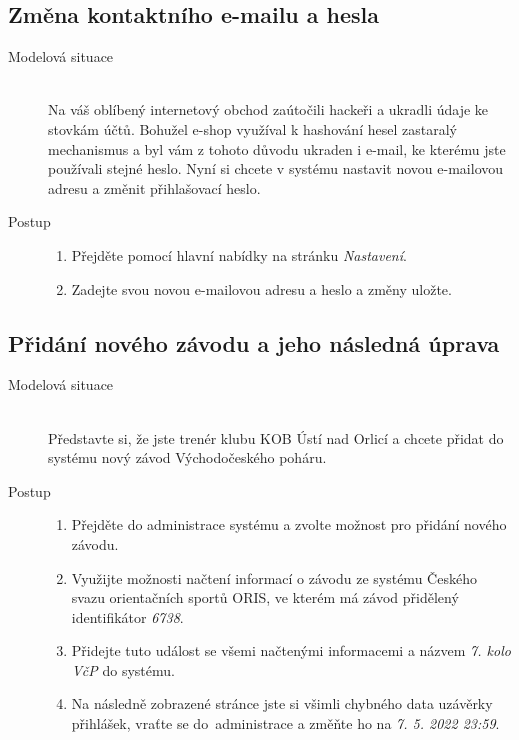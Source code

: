 \subsection{Změna kontaktního e-mailu a hesla}
\begin{description}
    \item[Modelová situace] \hfill \\
        Na váš oblíbený internetový obchod zaútočili hackeři a ukradli údaje ke stovkám účtů. Bohužel e-shop využíval k hashování hesel zastaralý mechanismus a byl vám z tohoto důvodu ukraden i e-mail, ke kterému jste používali stejné heslo. Nyní si chcete v systému nastavit novou e-mailovou adresu a změnit přihlašovací heslo.
        \item[Postup] \hfill
        \vspace{-2mm}
        \begin{enumerate}
            \item Přejděte pomocí hlavní nabídky na stránku \emph{Nastavení}.
            \item Zadejte svou novou e-mailovou adresu a heslo a změny uložte.
        \end{enumerate}
\end{description}

\newpage
\subsection{Přidání nového závodu a jeho následná úprava}
\begin{description}
    \item[Modelová situace] \hfill \\
        Představte si, že jste trenér klubu KOB Ústí nad Orlicí a chcete přidat do systému nový závod Východočeského poháru.
    \item[Postup] \hfill
        \vspace{-2mm}
        \begin{enumerate}
            \item Přejděte do administrace systému a zvolte možnost pro přidání nového závodu.
            \item Využijte možnosti načtení informací o závodu ze systému Českého svazu orientačních sportů ORIS, ve kterém má závod přidělený identifikátor \emph{6738}.
            \item Přidejte tuto událost se všemi načtenými informacemi a názvem \emph{7. kolo VčP} do systému.
            \item Na následně zobrazené stránce jste si všimli chybného data uzávěrky přihlášek, vraťte se do~administrace a změňte ho na \emph{7. 5. 2022 23:59}.
        \end{enumerate}
\end{description}

